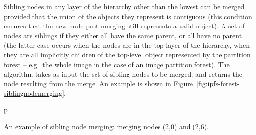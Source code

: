 Sibling nodes in any layer of the hierarchy other than the lowest can be merged provided that the union of the objects they represent is contiguous (this condition ensures that the new node post-merging still represents a valid object). A set of nodes are siblings if they either all have the same parent, or all have no parent (the latter case occurs when the nodes are in the top layer of the hierarchy, when they are all implicitly children of the top-level object represented by the partition forest -- e.g.~the whole image in the case of an image partition forest). The algorithm takes as input the set of sibling nodes to be merged, and returns the node resulting from the merge. An example is shown in Figure~\ref{fig:ipfs-forest-siblingnodemerging}.

\begin{stusubfig}{p}
	\hspace{8mm}%
	\hspace{8mm}%
	\hspace{8mm}%
\caption{An example of sibling node merging: merging nodes (2,0) and (2,6).}
\label{fig:ipfs-forest-siblingnodemerging}
\end{stusubfig}


